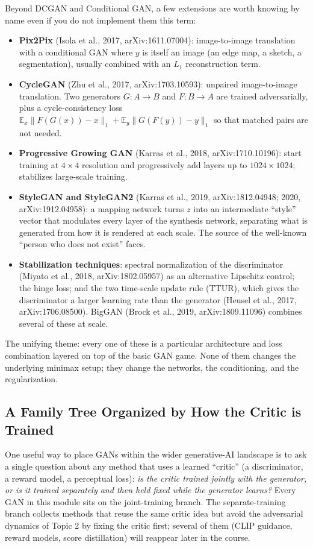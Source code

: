 \documentclass[11pt]{article}
\newcommand{\E}{\mathbb{E}}
\theoremstyle{remark}
\begin{document}
Beyond DCGAN and Conditional GAN, a few extensions are worth knowing by name even if you do not implement them this term:
\begingroup\sloppy
\begin{itemize}
    \item \textbf{Pix2Pix} (Isola et al., 2017, arXiv:1611.07004): image-to-image translation with a conditional GAN where $y$ is itself an image (an edge map, a sketch, a segmentation), usually combined with an $L_1$ reconstruction term.
    \item \textbf{CycleGAN} (Zhu et al., 2017, arXiv:1703.10593): unpaired image-to-image translation. Two generators $G:A\to B$ and $F:B\to A$ are trained adversarially, plus a cycle-consistency loss $\E_x\|F(G(x))-x\|_1+\E_y\|G(F(y))-y\|_1$ so that matched pairs are not needed.
    \item \textbf{Progressive Growing GAN} (Karras et al., 2018, arXiv:1710.10196): start training at $4\times 4$ resolution and progressively add layers up to $1024\times 1024$; stabilizes large-scale training.
    \item \textbf{StyleGAN and StyleGAN2} (Karras et al., 2019, arXiv:1812.04948; 2020, arXiv:1912.04958): a mapping network turns $z$ into an intermediate ``style'' vector that modulates every layer of the synthesis network, separating what is generated from how it is rendered at each scale. The source of the well-known ``person who does not exist'' faces.
    \item \textbf{Stabilization techniques}: spectral normalization of the discriminator (Miyato et al., 2018, arXiv:1802.05957) as an alternative Lipschitz control; the hinge loss; and the two time-scale update rule (TTUR), which gives the discriminator a larger learning rate than the generator (Heusel et al., 2017, arXiv:1706.08500). BigGAN (Brock et al., 2019, arXiv:1809.11096) combines several of these at scale.
\end{itemize}
\endgroup
The unifying theme: every one of these is a particular architecture and loss combination layered on top of the basic GAN game. None of them changes the underlying minimax setup; they change the networks, the conditioning, and the regularization.

\subsection{A Family Tree Organized by How the Critic is Trained}

One useful way to place GANs within the wider generative-AI landscape is to ask a single question about any method that uses a learned ``critic'' (a discriminator, a reward model, a perceptual loss): \emph{is the critic trained jointly with the generator, or is it trained separately and then held fixed while the generator learns?} Every GAN in this module sits on the joint-training branch. The separate-training branch collects methods that reuse the same critic idea but avoid the adversarial dynamics of Topic 2 by fixing the critic first; several of them (CLIP guidance, reward models, score distillation) will reappear later in the course.
\end{document}
